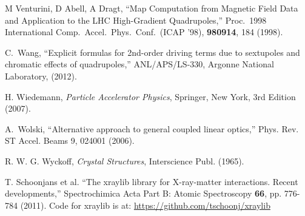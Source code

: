 \begin{thebibliography}{XXXXXXX99}
M Venturini, D Abell, A Dragt, 
``Map Computation from Magnetic Field Data and Application to the LHC
High-Gradient Quadrupoles,'' 
Proc.\ 1998 International Comp.\ Accel.\ Phys.\ Conf.\ (ICAP '98),
{\bf 980914}, 184 (1998).

C.~Wang,
``Explicit formulas for 2nd-order driving terms due to sextupoles and
chromatic effects of quadrupoles,''
ANL/APS/LS-330, Argonne National Laboratory, (2012).

H. Wiedemann, {\em Particle Accelerator Physics}, Springer, New York, 3rd Edition (2007). 

A.~Wolski,  ``Alternative approach to general coupled linear optics,''
Phys. Rev. ST Accel. Beams 9, 024001 (2006).

R. W. G. Wyckoff, {\em Crystal Structures}, Interscience Publ. (1965).

T. Schoonjans et al. ``The xraylib library for X-ray-matter
interactions. Recent developments,'' Spectrochimica Acta Part B: Atomic
Spectroscopy {\bf 66}, pp. 776-784 (2011).
Code for xraylib is at: \hfill\break
\hspace*{0.3in}
\url{https://github.com/tschoonj/xraylib}

\end{thebibliography}
